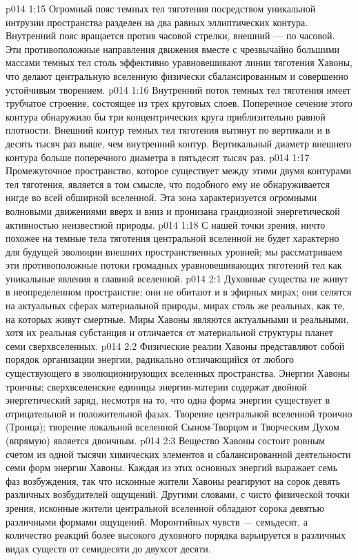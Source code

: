 \vs p014 1:15 Огромный пояс темных тел тяготения посредством уникальной интрузии пространства разделен на два равных эллиптических контура. Внутренний пояс вращается против часовой стрелки, внешний --- по часовой. Эти противоположные направления движения вместе с чрезвычайно большими массами темных тел столь эффективно уравновешивают линии тяготения Хавоны, что делают центральную вселенную физически сбалансированным и совершенно устойчивым творением.
\vs p014 1:16 Внутренний поток темных тел тяготения имеет трубчатое строение, состоящее из трех круговых слоев. Поперечное сечение этого контура обнаружило бы три концентрических круга приблизительно равной плотности. Внешний контур темных тел тяготения вытянут по вертикали и в десять тысяч раз выше, чем внутренний контур. Вертикальный диаметр внешнего контура больше поперечного диаметра в пятьдесят тысяч раз.
\vs p014 1:17 Промежуточное пространство, которое существует между этими двумя контурами тел тяготения, является  в том смысле, что подобного ему не обнаруживается нигде во всей обширной вселенной. Эта зона характеризуется огромными волновыми движениями вверх и вниз и пронизана грандиозной энергетической активностью неизвестной природы.
\vs p014 1:18 С нашей точки зрения, ничто похожее на темные тела тяготения центральной вселенной не будет характерно для будущей эволюции внешних пространственных уровней; мы рассматриваем эти противоположные потоки громадных уравновешивающих тяготений тел как уникальные явления в главной вселенной.
\vs p014 2:1 Духовные существа не живут в неопределенном пространстве; они не обитают и в эфирных мирах; они селятся на актуальных сферах материальной природы, мирах столь же реальных, как те, на которых живут смертные. Миры Хавоны являются актуальными и реальными, хотя их реальная субстанция и отличается от материальной структуры планет семи сверхвселенных.
\vs p014 2:2 Физические реалии Хавоны представляют собой порядок организации энергии, радикально отличающийся от любого существующего в эволюционирующих вселенных пространства. Энергии Хавоны троичны; сверхвселенские единицы энергии\hyp{}материи содержат двойной энергетический заряд, несмотря на то, что одна форма энергии существует в отрицательной и положительной фазах. Творение центральной вселенной троично (Троица); творение локальной вселенной Сыном\hyp{}Творцом и Творческим Духом (впрямую) является двоичным.
\vs p014 2:3 Вещество Хавоны состоит ровным счетом из одной тысячи химических элементов и сбалансированной деятельности семи форм энергии Хавоны. Каждая из этих основных энергий выражает семь фаз возбуждения, так что исконные жители Хавоны реагируют на сорок девять различных возбудителей ощущений. Другими словами, с чисто физической точки зрения, исконные жители центральной вселенной обладают сорока девятью различными формами ощущений. Моронтийных чувств --- семьдесят, а количество реакций более высокого духовного порядка варьируется в различных видах существ от семидесяти до двухсот десяти.
